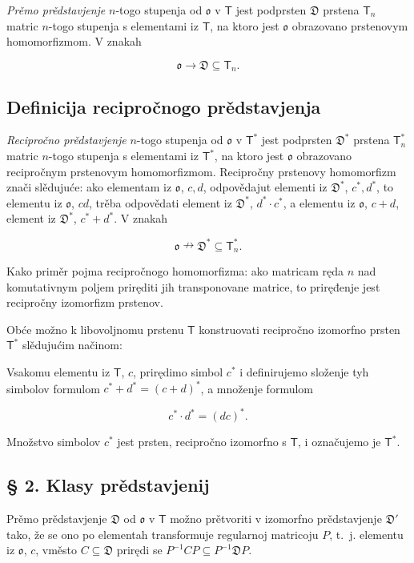 \documentclass[11pt]{article}
\begin{document}
\emph{Prěmo prědstavjenje} \(n\)-togo stupenja od \(\mathfrak{o}\) v \(\mathsf T\) jest podprsten \(\mathfrak D\) prstena \(\mathsf T_n\) matric \(n\)-togo stupenja s elementami iz \(\mathsf T\), na ktoro jest \(\mathfrak{o}\) obrazovano prstenovym homomorfizmom. V znakah

\[
\mathfrak{o}\to\mathfrak D\subseteq\mathsf T_n.
\]

\subsection*{Definicija recipročnogo prědstavjenja}\label{definition-der-reziproken-darstellung}

\emph{Recipročno prědstavjenje} \(n\)-togo stupenja od \(\mathfrak{o}\) v \(\mathsf T^*\) jest podprsten \(\mathfrak D^*\) prstena \(\mathsf T_n^*\) matric \(n\)-togo stupenja s elementami iz \(\mathsf T^*\), na ktoro jest \(\mathfrak{o}\) obrazovano recipročnym prstenovym homomorfizmom. Recipročny prstenovy homomorfizm znači slědujuće: ako elementam iz \(\mathfrak{o}\), \(c,d\), odpovědajut elementi iz \(\mathfrak D^*\), \(c^*,d^*\), to elementu iz \(\mathfrak{o}\), \(cd\), trěba odpovědati element iz \(\mathfrak D^*\), \(d^*\cdot c^*\), a elementu iz \(\mathfrak{o}\), \(c+d\), element iz \(\mathfrak D^*\), \(c^*+d^*\). V znakah

\[
\mathfrak{o}\nrightarrow\mathfrak D^*\subseteq\mathsf T_n^*.
\]

Kako priměr pojma recipročnogo homomorfizma: ako matricam ręda \(n\) nad komutativnym poljem priręditi jih transponovane matrice, to priręđenje jest recipročny izomorfizm prstenov.

Obće možno k libovoljnomu prstenu \(\mathsf T\) konstruovati recipročno izomorfno prsten \(\mathsf T^*\) slědujućim načinom:

Vsakomu elementu iz \(\mathsf T\), \(c\), prirędimo simbol \(c^*\) i definirujemo složenje tyh simbolov formulom \(c^*+d^*=(c+d)^*\), a množenje formulom

\[
c^*\cdot d^*=(dc)^*.
\]

Množstvo simbolov \(c^*\) jest prsten, recipročno izomorfno s \(\mathsf T\), i označujemo je \(\mathsf T^*\).

\subsection*{§ 2. Klasy prědstavjenij}\label{darstellungsklassen}

Prěmo prědstavjenje \(\mathfrak D\) od \(\mathfrak{o}\) v \(\mathsf T\) možno prětvoriti v izomorfno prědstavjenje \(\mathfrak D'\) tako, že se ono po elementah transformuje regularnoj matricoju \(P\), t.~j. elementu iz \(\mathfrak{o}\), \(c\), vměsto \(C\subseteq\mathfrak D\) prirędi se \(P^{-1}CP\subseteq P^{-1}\mathfrak D P\).
\end{document}
